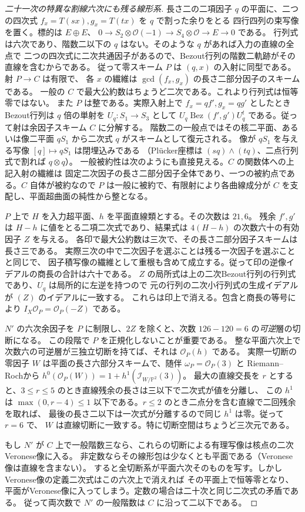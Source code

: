\begin{proof}[二十一次の特異な割線六次にも残る線形系]
長さ二の二項因子 $q$ の平面に、二つの四次式 $f_x=T(sx),g_x=T(tx)$ を $q$ で割った余りをとる
四行四列の束写像を置く。標的は $E\oplus E$、
$0\to S_2\otimes\mathcal O(-1)\to S_4\otimes\mathcal O\to E\to0$ である。
行列式は六次であり、階数二以下の $q$ はない。そのような $q$ があれば入力の直線の全点で
二つの四次式に二次共通因子があるので、Bezout行列の階数二軌跡がその直線を含むからである。
従って零スキーム $P$ は $(q,x)$ の入射に同型である。射 $P\to C$ は有限で、
各 $x$ の繊維は $\gcd(f_x,g_x)$ の長さ二部分因子のスキームである。
一般の $C$ で最大公約数はちょうど二次である。これより行列式は恒等零ではない。
また $P$ は整である。実際入射上で $f_x=q f',g_x=q g'$ としたときBezout行列は
$q$ 倍の単射を $U_q:S_1\to S_3$ として
$U_q\operatorname{Bez}(f',g')U_q^t$ である。従って射は余因子スキーム $C$ に分解する。
階数二の一般点ではその核二平面、あるいは像二平面 $qS_1$ から二次式 $q$ がスキームとして復元される。
像が $qS_1$ を与える写像 $[q]\mapsto qS_1$ は閉埋込みである
（Plücker座標は $(sq)\wedge(tq)$、二点行列式で割れば $q\otimes q$）。
一般被約性は次のようにも直接見える。$C$ の関数体への上記入射の繊維は
固定二次因子の長さ二部分因子全体であり、一つの被約点である。$C$ 自体が被約なので
$P$ は一般に被約で、有限射により各曲線成分が $C$ を支配し、平面超曲面の純性から整となる。

$P$ 上で $H$ を入力超平面、$h$ を平面直線類とする。その次数は $21,6$。
残余 $f',g'$ は $H-h$ に値をとる二項二次式であり、結果式は $4(H-h)$ の次数六十の有効因子 $Z$ を与える。
各印で最大公約数は三次で、その長さ二部分因子スキームは長さ三である。
実際三次の中で二次因子を選ぶことは残る一次因子を選ぶことと同じで、
因子積写像の繊維として重根も含めて成立する。従って印の逆像イデアルの商長の合計は六十である。
$Z$ の局所式は上の二次Bezout行列の行列式であり、$U_q$ は局所的に左逆を持つので
元の行列の二次小行列式の生成イデアルが $(Z)$ のイデアルに一致する。
これらは印上で消える。包含と商長の等号により $I_X\mathcal O_P=\mathcal O_P(-Z)$ である。

$N'$ の六次余因子を $P$ に制限し、$2Z$ を除くと、次数 $126-120=6$ の\emph{可逆}層の切断になる。
この段階で $P$ を正規化しないことが重要である。
整な平面六次上で次数六の可逆層が三独立切断を持てば、それは $\mathcal O_P(h)$ である。
実際一切断の零因子 $W$ は平面の長さ六部分スキームで、随伴 $\omega_P=\mathcal O_P(3)$ と
Riemann--Rochから $h^0(\mathcal O_P(W))=1+h^1(\mathcal I_{W/\mathbb P^2}(3))$。
最大の直線交長を $r$ とすると、$3\le r\le5$ のとき直線残余の長さは三以下で二次式が値を分離し、
この $h^1$ は $\max(0,r-4)\le1$ 以下である。$r\le2$ のとき二点分を含む直線で二回残余を取れば、
最後の長さ二以下は一次式が分離するので同じ $h^1$ は零。従って $r=6$ で、
$W$ は直線切断に一致する。特に切断空間はちょうど三次元である。

もし $N'$ が $C$ 上で一般階数三なら、これらの切断による有理写像は核点の二次Veronese像に入る。
非定数ならその線形包は少なくとも平面である（Veronese像は直線を含まない）。
すると全切断系が平面六次そのものを写す。しかしVeronese像の定義二次式はこの六次上で消えれば
その平面上で恒等零となり、平面がVeronese像に入ってしまう。定数の場合は二十次と同じ二次式の矛盾である。
従って両次数で $N'$ の一般階数は $C$ に沿って二以下である。
\end{proof}

